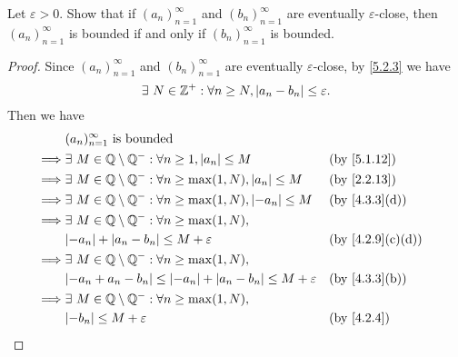 \begin{ex}\label{ex:5.2.2}
  Let \(\varepsilon > 0\).
  Show that if \((a_n)_{n = 1}^{\infty}\) and \((b_n)_{n = 1}^{\infty}\) are eventually \(\varepsilon\)-close, then \((a_n)_{n = 1}^{\infty}\) is bounded if and only if \((b_n)_{n = 1}^{\infty}\) is bounded.
\end{ex}

\begin{proof}
  Since \((a_n)_{n = 1}^{\infty}\) and \((b_n)_{n = 1}^{\infty}\) are eventually \(\varepsilon\)-close, by \cref{5.2.3} we have
  \[
    \exists\ N \in \mathbb{Z}^+ : \forall n \geq N, \left\lvert a_n - b_n\right\rvert \leq \varepsilon.
  \]
  Then we have
  \begin{align*}
             & (a_n)_{n = 1}^\infty \text{ is bounded}                                                                                          \\
    \implies & \exists\ M \in \Q \setminus \Q^- : \forall n \geq 1, \abs{a_n} \leq M                        &  & \text{(by \cref{5.1.12})}      \\
    \implies & \exists\ M \in \Q \setminus \Q^- : \forall n \geq \max(1, N), \abs{a_n} \leq M               &  & \text{(by \cref{2.2.13})}      \\
    \implies & \exists\ M \in \Q \setminus \Q^- : \forall n \geq \max(1, N), \abs{-a_n} \leq M              &  & \text{(by \cref{4.3.3}(d))}    \\
    \implies & \exists\ M \in \Q \setminus \Q^- : \forall n \geq \max(1, N),                                                                    \\
             & \abs{-a_n} + \abs{a_n - b_n} \leq M + \varepsilon                                            &  & \text{(by \cref{4.2.9}(c)(d))} \\
    \implies & \exists\ M \in \Q \setminus \Q^- : \forall n \geq \max(1, N),                                                                    \\
             & \abs{-a_n + a_n - b_n} \leq \abs{-a_n} + \abs{a_n - b_n} \leq M + \varepsilon                &  & \text{(by \cref{4.3.3}(b))}    \\
    \implies & \exists\ M \in \Q \setminus \Q^- : \forall n \geq \max(1, N),                                                                    \\
             & \abs{-b_n} \leq M + \varepsilon                                                              &  & \by{4.2.4}                     \\

\end{align*}
\end{proof}
